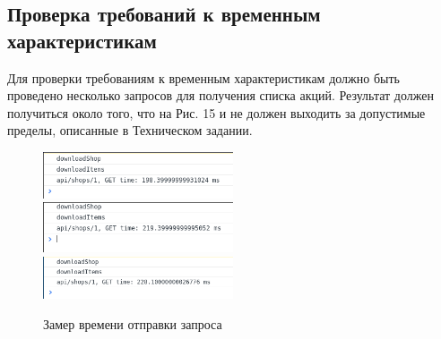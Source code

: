 \subsection{Проверка требований к временным характеристикам}
Для проверки требованиям к временным характеристикам должно быть проведено
несколько запросов для получения списка акций. Результат должен получиться
около того, что на Рис. 15 и не должен выходить за допустимые пределы,
описанные в Техническом задании.
\begin{figure}[H]
    \centering
    \includegraphics[width=0.5\textwidth]{./screenshots/get1.png}
    \includegraphics[width=0.5\textwidth]{./screenshots/get2.png}
    \includegraphics[width=0.5\textwidth]{./screenshots/get3.png}
    \caption{Замер времени отправки запроса}
\end{figure}

